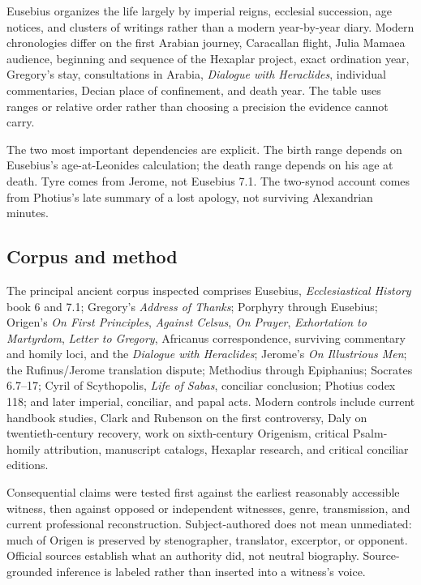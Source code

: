 Eusebius organizes the life largely by imperial reigns, ecclesial succession,
age notices, and clusters of writings rather than a modern year-by-year diary.
Modern chronologies differ on the first Arabian journey, Caracallan flight,
Julia Mamaea audience, beginning and sequence of the Hexaplar project, exact
ordination year, Gregory's stay, consultations in Arabia, \emph{Dialogue with
Heraclides}, individual commentaries, Decian place of confinement, and death
year. The table uses ranges or relative order rather than choosing a precision
the evidence cannot carry.

The two most important dependencies are explicit. The birth range depends on
Eusebius's age-at-Leonides calculation; the death range depends on his age at
death. Tyre comes from Jerome, not Eusebius 7.1. The two-synod account comes
from Photius's late summary of a lost apology, not surviving Alexandrian
minutes.

\subsection{Corpus and method}

The principal ancient corpus inspected comprises Eusebius,
\emph{Ecclesiastical History} book 6 and 7.1; Gregory's \emph{Address of Thanks};
Porphyry through Eusebius; Origen's \emph{On First Principles}, \emph{Against
Celsus}, \emph{On Prayer}, \emph{Exhortation to Martyrdom}, \emph{Letter to
Gregory}, Africanus correspondence, surviving commentary and homily loci, and
the \emph{Dialogue with Heraclides}; Jerome's \emph{On Illustrious Men}; the
Rufinus/Jerome translation dispute; Methodius through Epiphanius; Socrates
6.7--17; Cyril of Scythopolis, \emph{Life of Sabas}, conciliar conclusion;
Photius codex 118; and
later imperial, conciliar, and papal acts. Modern controls include current
handbook studies, Clark and Rubenson on the first controversy, Daly on
twentieth-century recovery, work on sixth-century Origenism, critical
Psalm-homily attribution, manuscript catalogs, Hexaplar research, and critical
conciliar editions.

Consequential claims were tested first against the earliest reasonably
accessible witness, then against opposed or independent witnesses, genre,
transmission, and current professional reconstruction. Subject-authored does
not mean unmediated: much of Origen is preserved by stenographer, translator,
excerptor, or opponent. Official sources establish what an authority did, not
neutral biography. Source-grounded inference is labeled rather than inserted
into a witness's voice.

